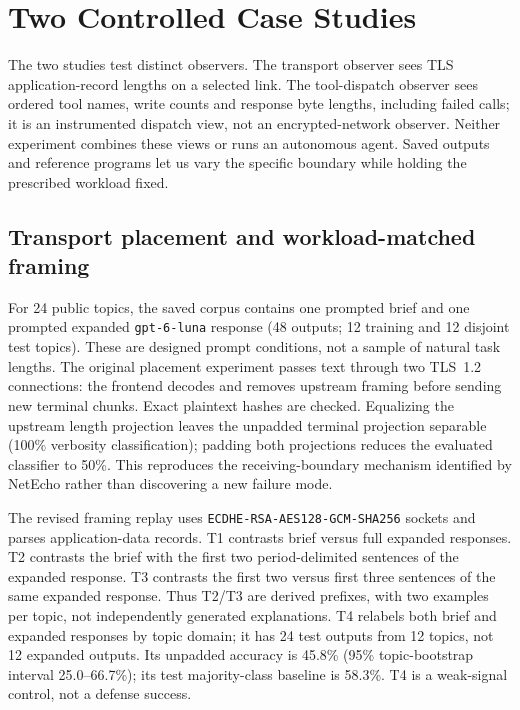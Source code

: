 \section{Two Controlled Case Studies}\label{sec:controlled-placement}
The two studies test distinct observers. The transport observer sees TLS application-record lengths on a selected link. The tool-dispatch observer sees ordered tool names, write counts and response byte lengths, including failed calls; it is an instrumented dispatch view, not an encrypted-network observer. Neither experiment combines these views or runs an autonomous agent. Saved outputs and reference programs let us vary the specific boundary while holding the prescribed workload fixed.

\subsection{Transport placement and workload-matched framing}
For 24 public topics, the saved corpus contains one prompted brief and one prompted expanded \texttt{gpt-6-luna} response (48 outputs; 12 training and 12 disjoint test topics). These are designed prompt conditions, not a sample of natural task lengths. The original placement experiment passes text through two TLS~1.2 connections: the frontend decodes and removes upstream framing before sending new terminal chunks. Exact plaintext hashes are checked. Equalizing the upstream length projection leaves the unpadded terminal projection separable (100\% verbosity classification); padding both projections reduces the evaluated classifier to 50\%. This reproduces the receiving-boundary mechanism identified by NetEcho rather than discovering a new failure mode.

The revised framing replay uses \texttt{ECDHE-RSA-AES128-GCM-SHA256} sockets and parses application-data records. T1 contrasts brief versus full expanded responses. T2 contrasts the brief with the first two period-delimited sentences of the expanded response. T3 contrasts the first two versus first three sentences of the same expanded response. Thus T2/T3 are derived prefixes, with two examples per topic, not independently generated explanations. T4 relabels both brief and expanded responses by topic domain; it has 24 test outputs from 12 topics, not 12 expanded outputs. Its unpadded accuracy is 45.8\% (95\% topic-bootstrap interval 25.0--66.7\%); its test majority-class baseline is 58.3\%. T4 is a weak-signal control, not a defense success.



